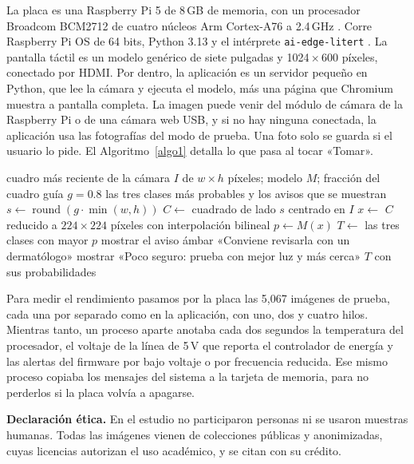 \documentclass[pdflatex,sn-mathphys-num]{sn-jnl}%
\theoremstyle{thmstyleone}%
\theoremstyle{thmstyletwo}%
\theoremstyle{thmstylethree}%
\begin{document}
La placa es una Raspberry Pi 5 de 8\,GB de memoria, con un procesador Broadcom BCM2712 de cuatro núcleos Arm Cortex-A76 a 2.4\,GHz \cite{rpi5}. Corre Raspberry Pi OS de 64 bits, Python 3.13 y el intérprete \texttt{ai-edge-litert} \cite{ai_edge_litert}. La pantalla táctil es un modelo genérico de siete pulgadas y 1024\,$\times$\,600 píxeles, conectado por HDMI. Por dentro, la aplicación es un servidor pequeño en Python, que lee la cámara y ejecuta el modelo, más una página que Chromium muestra a pantalla completa. La imagen puede venir del módulo de cámara de la Raspberry Pi o de una cámara web USB, y si no hay ninguna conectada, la aplicación usa las fotografías del modo de prueba. Una foto solo se guarda si el usuario lo pide. El Algoritmo~\ref{algo1} detalla lo que pasa al tocar «Tomar».

\begin{algorithm}
\caption{Qué hace la aplicación al tocar «Tomar»}\label{algo1}
\begin{algorithmic}[1]
\Require cuadro más reciente de la cámara $I$ de $w\times h$ píxeles; modelo $M$; fracción del cuadro guía $g=0.8$
\Ensure las tres clases más probables y los avisos que se muestran
\State $s \gets \operatorname{round}(g\cdot\min(w,h))$
\State $C \gets$ cuadrado de lado $s$ centrado en $I$
\State $x \gets$ $C$ reducido a $224\times224$ píxeles con interpolación bilineal
\State $p \gets M(x)$
\State $T \gets$ las tres clases con mayor $p$
\label{algln2}
    \State mostrar el aviso ámbar «Conviene revisarla con un dermatólogo»
\EndIf
{}
    \State mostrar «Poco seguro: prueba con mejor luz y más cerca»
\EndIf
\State \Return $T$ con sus probabilidades
\end{algorithmic}
\end{algorithm}

Para medir el rendimiento pasamos por la placa las 5,067 imágenes de prueba, cada una por separado como en la aplicación, con uno, dos y cuatro hilos. Mientras tanto, un proceso aparte anotaba cada dos segundos la temperatura del procesador, el voltaje de la línea de 5\,V que reporta el controlador de energía y las alertas del firmware por bajo voltaje o por frecuencia reducida. Ese mismo proceso copiaba los mensajes del sistema a la tarjeta de memoria, para no perderlos si la placa volvía a apagarse.

\textbf{Declaración ética.} En el estudio no participaron personas ni se usaron muestras humanas. Todas las imágenes vienen de colecciones públicas y anonimizadas, cuyas licencias autorizan el uso académico, y se citan con su crédito.
\end{document}
